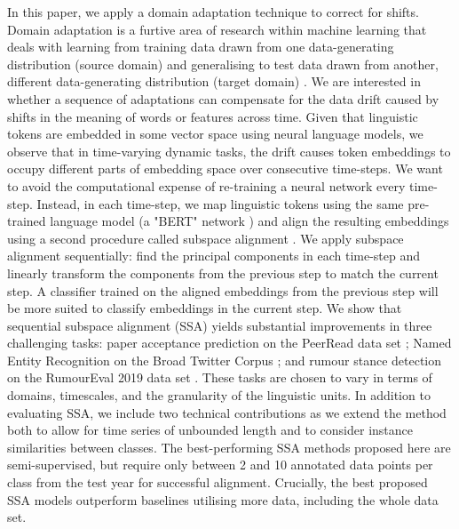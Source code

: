 \documentclass[letterpaper]{article} %
\begin{document}
In this paper, we apply a domain adaptation technique to correct for shifts. Domain adaptation is a furtive area of research within machine learning that deals with learning from training data drawn from one data-generating distribution (source domain) and generalising to test data drawn from another, different data-generating distribution (target domain) \cite{kouw2019review}. %
We are interested in whether a sequence of adaptations can compensate for the data drift caused by shifts in the meaning of words or features across time. Given that linguistic tokens are embedded in some vector space using neural language models, we observe that in time-varying dynamic tasks, the drift causes token embeddings to occupy different parts of embedding space over consecutive time-steps. We want to avoid the computational expense of re-training a neural network every time-step. Instead, in each time-step, we map linguistic tokens using the same pre-trained language model (a "BERT" network \cite{bert}) and align the resulting embeddings using a second procedure called subspace alignment \cite{fernando2013unsupervised}. We apply subspace alignment sequentially: find the principal components in each time-step and linearly transform the components from the previous step to match the current step. A classifier trained on the aligned embeddings from the previous step will be more suited to classify embeddings in the current step. We show that sequential subspace alignment (SSA) yields substantial improvements in three challenging tasks: paper acceptance prediction on the PeerRead data set \cite{kang18naacl}; Named Entity Recognition on the Broad Twitter Corpus \cite{derczynski:2016}; and rumour stance detection on the RumourEval 2019 data set \cite{rumour:19}. %
These tasks are chosen to vary in terms of domains, timescales, and the granularity of the linguistic units. %
In addition to evaluating SSA, we include two technical contributions as we extend the method both to allow for time series of unbounded length and to consider instance similarities between classes.
The best-performing SSA methods proposed here are semi-supervised, but require only between 2 and 10 annotated data points per class from the test year for successful alignment.
Crucially, the best proposed SSA models outperform baselines utilising more data, including the whole data set.
\end{document}

